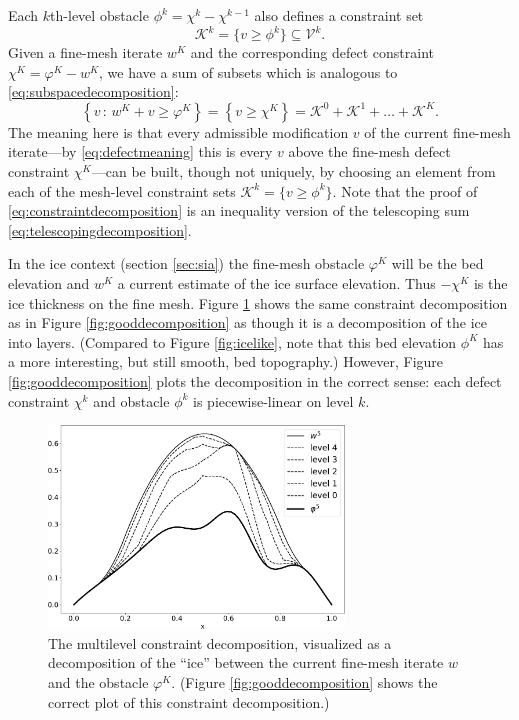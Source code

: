 \documentclass[letterpaper,final,12pt,reqno]{amsart}
\numberwithin{equation}{section}
\numberwithin{figure}{section}
\numberwithin{table}{section}
\begin{document}
Each $k$th-level obstacle $\phi^k = \chi^k - \chi^{k-1}$ also defines a constraint set
\begin{equation}
  \mathcal{K}^k = \{v \ge \phi^k\} \subseteq \mathcal{V}^k.  \label{eq:levelconstraint}
\end{equation}
Given a fine-mesh iterate $w^K$ and the corresponding defect constraint $\chi^K = \varphi^K - w^K$, we have a sum of subsets which is analogous to \eqref{eq:subspacedecomposition}:
\begin{equation}
  \left\{v\,:\,w^K + v \ge \varphi^K\right\} = \left\{v \ge \chi^K\right\} = \mathcal{K}^0 + \mathcal{K}^1 + \dots + \mathcal{K}^K. \label{eq:constraintdecomposition}
\end{equation}
The meaning here is that every admissible modification $v$ of the current fine-mesh iterate---by \eqref{eq:defectmeaning} this is every $v$ above the fine-mesh defect constraint $\chi^K$---can be built, though not uniquely, by choosing an element from each of the mesh-level constraint sets $\mathcal{K}^k = \{v \ge \phi^k\}$.  Note that the proof of \eqref{eq:constraintdecomposition} is an inequality version of the telescoping sum \eqref{eq:telescopingdecomposition}.

In the ice context (section \ref{sec:sia}) the fine-mesh obstacle $\varphi^K$ will be the bed elevation and $w^K$ a current estimate of the ice surface elevation.  Thus $-\chi^K$ is the ice thickness on the fine mesh.  Figure \ref{fig:icelikedecomposition} shows the same constraint decomposition as in Figure \ref{fig:gooddecomposition} as though it is a decomposition of the ice into layers.  (Compared to Figure \ref{fig:icelike}, note that this bed elevation $\phi^K$ has a more interesting, but still smooth, bed topography.)  However, Figure \ref{fig:gooddecomposition} plots the decomposition in the correct sense: each defect constraint $\chi^k$ and obstacle $\phi^k$ is piecewise-linear on level $k$.

\begin{figure}
\includegraphics[width=0.7\textwidth]{fixfigs/icedec_defect.pdf}
\caption{The multilevel constraint decomposition, visualized as a decomposition of the ``ice'' between the current fine-mesh iterate $w$ and the obstacle $\varphi^K$.  (Figure \ref{fig:gooddecomposition} shows the correct plot of this constraint decomposition.)}
\label{fig:icelikedecomposition}
\end{figure}
\end{document}
